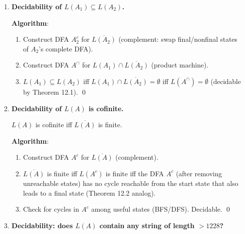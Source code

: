 \begin{enumerate}[{12.}1. ]
\textbf{Proof}: Let $A_{min}$ be the minimal DFA for $L$ with $n_{min}$ nonfinal states and $B$ any machine with $L(B)=L$ having $n_B$ nonfinal states.

Each nonfinal state $q$ of $A_{min}$ corresponds to a unique right-congruence class $[x]_{R_L}$ (by Nerode's theorem) with $\DBAR_{min}(s_0,x)=q$ and $x\notin L$ (since $q$ is nonfinal). In any machine $B$ with $L(B)=L$, two strings in different $R_L$-classes must lead to different states (otherwise $B$ would accept/reject some string incorrectly). Therefore $B$ must have at least as many nonfinal states as $A_{min}$. More precisely, the number of nonfinal classes of $R_L$ equals the number of nonfinal states in $A_{min}$, and $B$ must have at least this many nonfinal states. \qed

\item \textbf{Decidability of $L(A_1)\subseteq L(A_2)$.}

\textbf{Algorithm}:
\begin{enumerate}
\item Construct DFA $A_2^c$ for $\overline{L(A_2)}$ (complement: swap final/nonfinal states of $A_2$'s complete DFA).
\item Construct DFA $A^\cap$ for $L(A_1)\cap\overline{L(A_2)}$ (product machine).
\item $L(A_1)\subseteq L(A_2)$ iff $L(A_1)\cap\overline{L(A_2)}=\emptyset$ iff $L(A^\cap)=\emptyset$ (decidable by Theorem 12.1). \qed
\end{enumerate}

\item \textbf{Decidability of $L(A)$ is cofinite.}

$L(A)$ is cofinite iff $\overline{L(A)}$ is finite.

\textbf{Algorithm}:
\begin{enumerate}
\item Construct DFA $A^c$ for $\overline{L(A)}$ (complement).
\item $\overline{L(A)}$ is finite iff $L(A^c)$ is finite iff the DFA $A^c$ (after removing unreachable states) has no cycle reachable from the start state that also leads to a final state (Theorem 12.2 analog).
\item Check for cycles in $A^c$ among useful states (BFS/DFS). Decidable. \qed
\end{enumerate}

\item \textbf{Decidability: does $L(A)$ contain any string of length $> 1228$?}


\end{enumerate}
